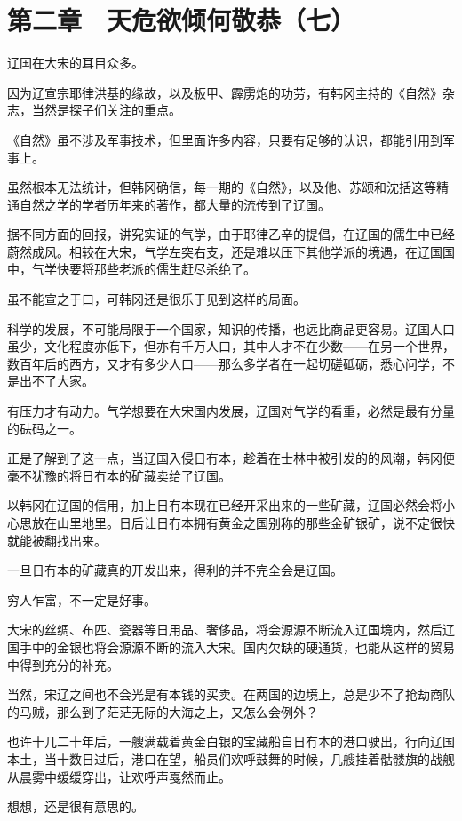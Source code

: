 \section{第二章　天危欲倾何敬恭（七）}

辽国在大宋的耳目众多。

因为辽宣宗耶律洪基的缘故，以及板甲、霹雳炮的功劳，有韩冈主持的《自然》杂志，当然是探子们关注的重点。

《自然》虽不涉及军事技术，但里面许多内容，只要有足够的认识，都能引用到军事上。

虽然根本无法统计，但韩冈确信，每一期的《自然》，以及他、苏颂和沈括这等精通自然之学的学者历年来的著作，都大量的流传到了辽国。

据不同方面的回报，讲究实证的气学，由于耶律乙辛的提倡，在辽国的儒生中已经蔚然成风。相较在大宋，气学左突右支，还是难以压下其他学派的境遇，在辽国国中，气学快要将那些老派的儒生赶尽杀绝了。

虽不能宣之于口，可韩冈还是很乐于见到这样的局面。

科学的发展，不可能局限于一个国家，知识的传播，也远比商品更容易。辽国人口虽少，文化程度亦低下，但亦有千万人口，其中人才不在少数——在另一个世界，数百年后的西方，又才有多少人口——那么多学者在一起切磋砥砺，悉心问学，不是出不了大家。

有压力才有动力。气学想要在大宋国内发展，辽国对气学的看重，必然是最有分量的砝码之一。

正是了解到了这一点，当辽国入侵日冇本，趁着在士林中被引发的的风潮，韩冈便毫不犹豫的将日冇本的矿藏卖给了辽国。

以韩冈在辽国的信用，加上日冇本现在已经开采出来的一些矿藏，辽国必然会将小心思放在山里地里。日后让日冇本拥有黄金之国别称的那些金矿银矿，说不定很快就能被翻找出来。

一旦日冇本的矿藏真的开发出来，得利的并不完全会是辽国。

穷人乍富，不一定是好事。

大宋的丝绸、布匹、瓷器等日用品、奢侈品，将会源源不断流入辽国境内，然后辽国手中的金银也将会源源不断的流入大宋。国内欠缺的硬通货，也能从这样的贸易中得到充分的补充。

当然，宋辽之间也不会光是有本钱的买卖。在两国的边境上，总是少不了抢劫商队的马贼，那么到了茫茫无际的大海之上，又怎么会例外？

也许十几二十年后，一艘满载着黄金白银的宝藏船自日冇本的港口驶出，行向辽国本土，当十数日过后，港口在望，船员们欢呼鼓舞的时候，几艘挂着骷髅旗的战舰从晨雾中缓缓穿出，让欢呼声戛然而止。

想想，还是很有意思的。

